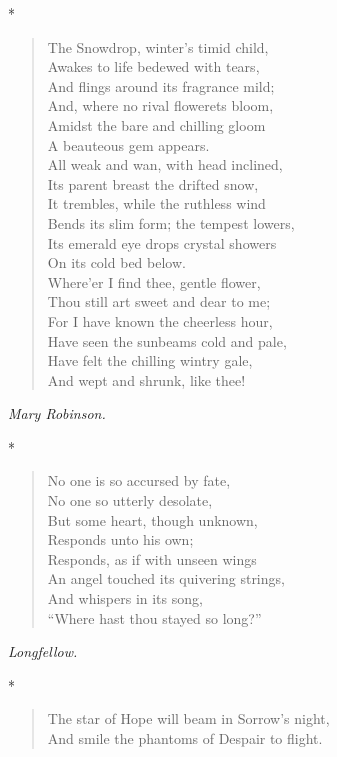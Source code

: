 \documentclass[11pt,twoside]{article}
\newcommand\stars{\begin{center}*\quad*\quad*\end{center}}
\newcommand\by[1]{\par\hfill\textit{#1}\par}
\begin{document}
\stars

\begin{verse}
The Snowdrop, winter’s timid child,\\
\quad Awakes to life bedewed with tears,\\
And flings around its fragrance mild;\\
And, where no rival flowerets bloom,\\
Amidst the bare and chilling gloom\\
\quad A beauteous gem appears.\\
All weak and wan, with head inclined,\\
\quad Its parent breast the drifted snow,\\
It trembles, while the ruthless wind\\
Bends its slim form; the tempest lowers,\\
Its emerald eye drops crystal showers\\
\quad On its cold bed below.\\
Where’er I find thee, gentle flower,\\
\quad Thou still art sweet and dear to me;\\
For I have known the cheerless hour,\\
Have seen the sunbeams cold and pale,\\
Have felt the chilling wintry gale,\\
\quad And wept and shrunk, like thee!
\end{verse}

\by{Mary Robinson.}

\stars

\begin{verse}
No one is so accursed by fate,\\
No one so utterly desolate,\\
\quad But some heart, though unknown,\\
\quad Responds unto his own;\\
Responds, as if with unseen wings\\
An angel touched its quivering strings,\\
\quad And whispers in its song,\\
\quad “Where hast thou stayed so long?”
\end{verse}

\by{Longfellow.}

\stars

\begin{verse}
The star of Hope will beam in Sorrow’s night,\\
And smile the phantoms of Despair to flight.
\end{verse}
\end{document}
